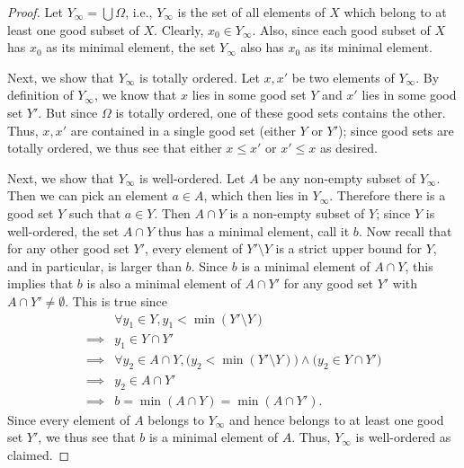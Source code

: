 \begin{proof}
  Let \(Y_{\infty} = \bigcup \Omega\), i.e., \(Y_{\infty}\) is the set of all elements of \(X\) which belong to at least one good subset of \(X\).
  Clearly, \(x_0 \in Y_{\infty}\).
  Also, since each good subset of \(X\) has \(x_0\) as its minimal element, the set \(Y_{\infty}\) also has \(x_0\) as its minimal element.

  Next, we show that \(Y_{\infty}\) is totally ordered.
  Let \(x, x'\) be two elements of \(Y_{\infty}\).
  By definition of \(Y_{\infty}\), we know that \(x\) lies in some good set \(Y\) and \(x'\) lies in some good set \(Y'\).
  But since \(\Omega\) is totally ordered, one of these good sets contains the other.
  Thus, \(x, x'\) are contained in a single good set (either \(Y\) or \(Y'\));
  since good sets are totally ordered, we thus see that either \(x \leq x'\) or \(x' \leq x\) as desired.

  Next, we show that \(Y_{\infty}\) is well-ordered.
  Let \(A\) be any non-empty subset of \(Y_{\infty}\).
  Then we can pick an element \(a \in A\), which then lies in \(Y_{\infty}\).
  Therefore there is a good set \(Y\) such that \(a \in Y\).
  Then \(A \cap Y\) is a non-empty subset of \(Y\);
  since \(Y\) is well-ordered, the set \(A \cap Y\) thus has a minimal element, call it \(b\).
  Now recall that for any other good set \(Y'\), every element of \(Y' \setminus Y\) is a strict upper bound for \(Y\), and in particular, is larger than \(b\).
  Since \(b\) is a minimal element of \(A \cap Y\), this implies that \(b\) is also a minimal element of \(A \cap Y'\) for any good set \(Y'\) with \(A \cap Y' \neq \emptyset\).
  This is true since
  \begin{align*}
             & \forall y_1 \in Y, y_1 < \min(Y' \setminus Y)                                                    \\
    \implies & y_1 \in Y \cap Y'                                                                                \\
    \implies & \forall y_2 \in A \cap Y, \big(y_2 < \min(Y' \setminus Y)\big) \land \big(y_2 \in Y \cap Y'\big) \\
    \implies & y_2 \in A \cap Y'                                                                                \\
    \implies & b = \min(A \cap Y) = \min(A \cap Y').
  \end{align*}
  Since every element of \(A\) belongs to \(Y_{\infty}\) and hence belongs to at least one good set \(Y'\), we thus see that \(b\) is a minimal element of \(A\).
  Thus, \(Y_{\infty}\) is well-ordered as claimed.


\end{proof}
